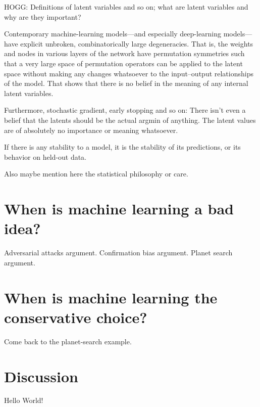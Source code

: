 \documentclass[11pt]{article}
\begin{document}
HOGG: Definitions of latent variables and so on; what are latent variables and why are they important?

Contemporary machine-learning models---and especially deep-learning models---have explicit unbroken, combinatorically large degeneracies.
That is, the weights and nodes in various layers of the network have permutation symmetries such that a very large space of permutation operators can be applied to the latent space without making any changes whatsoever to the input--output relationships of the model.
That shows that there is no belief in the meaning of any internal latent variables.

Furthermore, stochastic gradient, early stopping and so on:
There isn't even a belief that the latents should be the actual argmin of anything.
The latent values are of absolutely no importance or meaning whatsoever.

If there is any stability to a model, it is the stability of its predictions, or its behavior on held-out data.

Also maybe mention here the statistical philosophy or care.

\section{When is machine learning a bad idea?}

Adversarial attacks argument. Confirmation bias argument. Planet search argument.

\section{When is machine learning the conservative choice?}

Come back to the planet-search example.

\section{Discussion}\label{sec:discussion}

Hello World!



\end{document}
